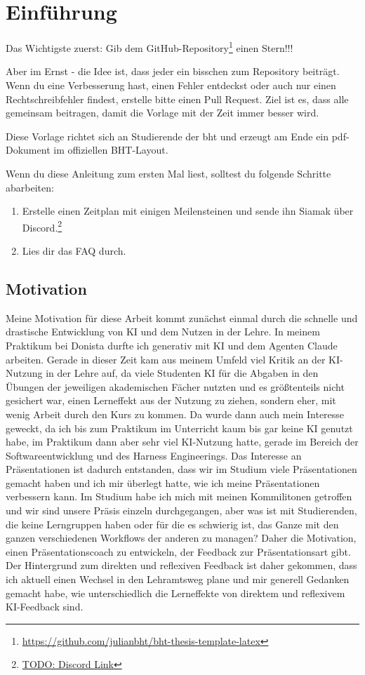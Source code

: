 \chapter{Einführung}
Das Wichtigste zuerst: Gib dem GitHub-Repository\footnote{\url{https://github.com/julianbht/bht-thesis-template-latex}} einen Stern!!! 

Aber im Ernst - die Idee ist, dass jeder ein bisschen zum Repository beiträgt. Wenn du eine Verbesserung hast, einen Fehler entdeckst oder auch nur einen Rechtschreibfehler findest, erstelle bitte einen Pull Request. Ziel ist es, dass alle gemeinsam beitragen, damit die Vorlage mit der Zeit immer besser wird.

Diese Vorlage richtet sich an Studierende der \gls{bht} und erzeugt am Ende ein \gls{pdf}-Dokument im offiziellen BHT-Layout.

Wenn du diese Anleitung zum ersten Mal liest, solltest du folgende Schritte abarbeiten:

\begin{enumerate}
    \item Erstelle einen Zeitplan mit einigen Meilensteinen und sende ihn Siamak über Discord.\footnote{\url{TODO: Discord Link}}

    \item Lies dir das FAQ durch.
\end{enumerate}

\section{Motivation}
Meine Motivation für diese Arbeit kommt zunächst einmal durch die schnelle und drastische Entwicklung von KI und dem Nutzen in der Lehre.
In meinem Praktikum bei Donista durfte ich generativ mit KI und dem Agenten Claude arbeiten.
Gerade in dieser Zeit kam aus meinem Umfeld viel Kritik an der KI-Nutzung in der Lehre auf, da viele Studenten KI für die Abgaben in den Übungen der jeweiligen akademischen Fächer nutzten und es größtenteils nicht gesichert war, einen Lerneffekt aus der Nutzung zu ziehen, sondern eher, mit wenig Arbeit durch den Kurs zu kommen.
Da wurde dann auch mein Interesse geweckt, da ich bis zum Praktikum im Unterricht kaum bis gar keine KI genutzt habe, im Praktikum dann aber sehr viel KI-Nutzung hatte, gerade im Bereich der Softwareentwicklung und des Harness Engineerings.
Das Interesse an Präsentationen ist dadurch entstanden, dass wir im Studium viele Präsentationen gemacht haben und ich mir überlegt hatte, wie ich meine Präsentationen verbessern kann. Im Studium habe ich mich mit meinen Kommilitonen getroffen und wir sind unsere Präsis einzeln durchgegangen, aber was ist mit Studierenden, die keine Lerngruppen haben oder für die es schwierig ist, das Ganze mit den ganzen verschiedenen Workflows der anderen zu managen?
Daher die Motivation, einen Präsentationscoach zu entwickeln, der Feedback zur Präsentationsart gibt. Der Hintergrund zum direkten und reflexiven Feedback ist daher gekommen, dass ich aktuell einen Wechsel in den Lehramtsweg plane und mir generell Gedanken gemacht habe, wie unterschiedlich die Lerneffekte von direktem und reflexivem KI-Feedback sind.

